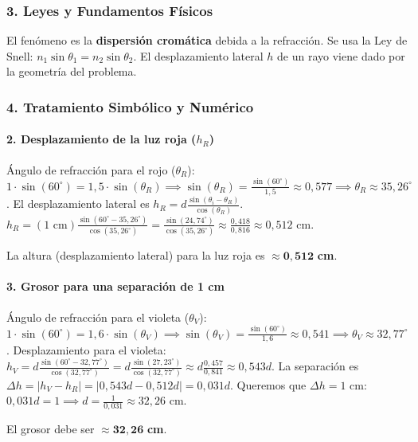 \subsubsection*{3. Leyes y Fundamentos Físicos}
El fenómeno es la \textbf{dispersión cromática} debida a la refracción. Se usa la Ley de Snell: $n_1\sin\theta_1 = n_2\sin\theta_2$. El desplazamiento lateral $h$ de un rayo viene dado por la geometría del problema.

\subsubsection*{4. Tratamiento Simbólico y Numérico}
\paragraph*{2. Desplazamiento de la luz roja ($h_R$)}
Ángulo de refracción para el rojo ($\theta_R$): $1 \cdot \sin(60^\circ) = 1,5 \cdot \sin(\theta_R) \implies \sin(\theta_R) = \frac{\sin(60^\circ)}{1,5} \approx 0,577 \implies \theta_R \approx 35,26^\circ$.
El desplazamiento lateral es $h_R = d \frac{\sin(\theta_i - \theta_R)}{\cos(\theta_R)}$.
$h_R = (1 \text{ cm}) \frac{\sin(60^\circ - 35,26^\circ)}{\cos(35,26^\circ)} = \frac{\sin(24,74^\circ)}{\cos(35,26^\circ)} \approx \frac{0,418}{0,816} \approx 0,512$ cm.
\begin{cajaresultado}
    La altura (desplazamiento lateral) para la luz roja es $\boldsymbol{\approx 0,512}$ \textbf{cm}.
\end{cajaresultado}

\paragraph*{3. Grosor para una separación de 1 cm}
Ángulo de refracción para el violeta ($\theta_V$): $1 \cdot \sin(60^\circ) = 1,6 \cdot \sin(\theta_V) \implies \sin(\theta_V) = \frac{\sin(60^\circ)}{1,6} \approx 0,541 \implies \theta_V \approx 32,77^\circ$.
Desplazamiento para el violeta: $h_V = d \frac{\sin(60^\circ - 32,77^\circ)}{\cos(32,77^\circ)} = d \frac{\sin(27,23^\circ)}{\cos(32,77^\circ)} \approx d \frac{0,457}{0,841} \approx 0,543d$.
La separación es $\Delta h = |h_V - h_R| = |0,543d - 0,512d| = 0,031d$.
Queremos que $\Delta h = 1$ cm: $0,031d = 1 \implies d = \frac{1}{0,031} \approx 32,26$ cm.
\begin{cajaresultado}
    El grosor debe ser $\boldsymbol{\approx 32,26}$ \textbf{cm}.
\end{cajaresultado}

